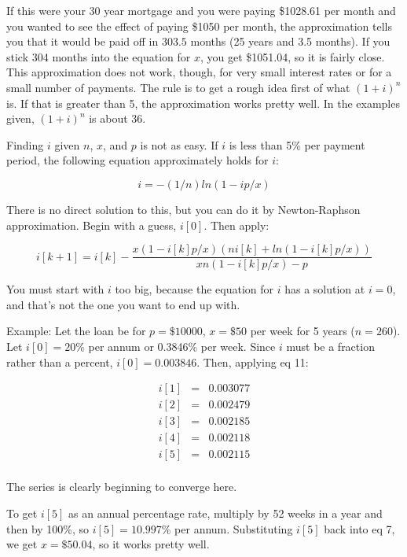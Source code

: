 If this were your 30 year mortgage and you were paying \$1028.61 per
month and you wanted to see the effect of paying \$1050 per month, the
approximation tells you that it would be paid off in $303.5$ months (25
years and 3.5 months).  If you stick 304 months into the equation for
$x$, you get \$1051.04, so it is fairly close.  This approximation does
not work, though, for very small interest rates or for a small number of
payments.  The rule is to get a rough idea first of what $(1 + i)^n$ is.
If that is greater than 5, the approximation works pretty well.  In the
examples given, $(1 + i)^n$ is about 36.

Finding $i$ given $n$, $x$, and $p$ is not as easy.  If $i$ is less than
5\% per payment period, the following equation approximately holds for
$i$:

\[ i = -(1/n) ln(1 - ip/x) \]

There is no direct solution to this, but you can do it by Newton-Raphson
approximation.  Begin with a guess, $i[0]$.  Then apply:

\[i[k+1] = i[k] -\frac{x(1 - i[k]p/x) (ni[k] + ln(1 - i[k]p/x))} {xn(1 -
  i[k]p/x) - p}\]

You must start with $i$ too big, because the equation for $i$ has a
solution at $i=0$, and that's not the one you want to end up with.

Example: Let the loan be for $p=\$10000$, $x=\$50$ per week for 5 years
($n=260$).  Let $i[0] = 20$\% per annum or 0.3846\% per week.  Since $i$
must be a fraction rather than a percent, $i[0] = 0.003846$.  Then,
applying eq 11:

\begin{eqnarray*}
  i[1]&=&0.003077\\
  i[2]&=&0.002479\\
  i[3]&=&0.002185\\
  i[4]&=&0.002118\\
  i[5]&=&0.002115\\
\end{eqnarray*}

The series is clearly beginning to converge here.

To get $i[5]$ as an annual percentage rate, multiply by 52 weeks in a
year and then by 100\%, so $i[5] = 10.997$\% per annum.  Substituting
$i[5]$ back into eq 7, we get $x = \$50.04$, so it works pretty well.

\Ref
 

